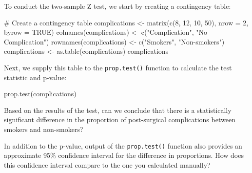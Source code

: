 \documentclass[
  letterpaper,
  DIV=11,
  numbers=noendperiod]{scrartcl}
\newenvironment{Shaded}{\begin{snugshade}}{\end{snugshade}}
\newcommand{\AttributeTok}[1]{\textcolor[rgb]{0.40,0.45,0.13}{#1}}
\newcommand{\CommentTok}[1]{\textcolor[rgb]{0.37,0.37,0.37}{#1}}
\newcommand{\ConstantTok}[1]{\textcolor[rgb]{0.56,0.35,0.01}{#1}}
\newcommand{\DecValTok}[1]{\textcolor[rgb]{0.68,0.00,0.00}{#1}}
\newcommand{\FunctionTok}[1]{\textcolor[rgb]{0.28,0.35,0.67}{#1}}
\newcommand{\NormalTok}[1]{\textcolor[rgb]{0.00,0.23,0.31}{#1}}
\newcommand{\OtherTok}[1]{\textcolor[rgb]{0.00,0.23,0.31}{#1}}
\newcommand{\StringTok}[1]{\textcolor[rgb]{0.13,0.47,0.30}{#1}}
\begin{document}
To conduct the two-sample Z test, we start by creating a contingency
table:

\begin{Shaded}
\begin{Highlighting}[]
\CommentTok{\# Create a contingency table}
\NormalTok{complications }\OtherTok{\textless{}{-}} \FunctionTok{matrix}\NormalTok{(}\FunctionTok{c}\NormalTok{(}\DecValTok{8}\NormalTok{, }\DecValTok{12}\NormalTok{, }\DecValTok{10}\NormalTok{, }\DecValTok{50}\NormalTok{), }\AttributeTok{nrow =} \DecValTok{2}\NormalTok{, }\AttributeTok{byrow =} \ConstantTok{TRUE}\NormalTok{)}
\FunctionTok{colnames}\NormalTok{(complications) }\OtherTok{\textless{}{-}} \FunctionTok{c}\NormalTok{(}\StringTok{"Complication"}\NormalTok{, }\StringTok{"No Complication"}\NormalTok{)}
\FunctionTok{rownames}\NormalTok{(complications) }\OtherTok{\textless{}{-}} \FunctionTok{c}\NormalTok{(}\StringTok{"Smokers"}\NormalTok{, }\StringTok{"Non{-}smokers"}\NormalTok{)}
\NormalTok{complications }\OtherTok{\textless{}{-}} \FunctionTok{as.table}\NormalTok{(complications)}
\NormalTok{complications}
\end{Highlighting}
\end{Shaded}

Next, we supply this table to the \texttt{prop.test()} function to
calculate the test statistic and p-value:

\begin{Shaded}
\begin{Highlighting}[]
\FunctionTok{prop.test}\NormalTok{(complications)}
\end{Highlighting}
\end{Shaded}

\begin{tcolorbox}[enhanced jigsaw, bottomrule=.15mm, coltitle=black, colbacktitle=quarto-callout-important-color!10!white, left=2mm, bottomtitle=1mm, breakable, colframe=quarto-callout-important-color-frame, toprule=.15mm, titlerule=0mm, title={Question 3}, opacitybacktitle=0.6, arc=.35mm, rightrule=.15mm, opacityback=0, leftrule=.75mm, toptitle=1mm, colback=white]

Based on the results of the test, can we conclude that there is a
statistically significant difference in the proportion of post-surgical
complications between smokers and non-smokers?

\end{tcolorbox}

\begin{tcolorbox}[enhanced jigsaw, bottomrule=.15mm, coltitle=black, colbacktitle=quarto-callout-important-color!10!white, left=2mm, bottomtitle=1mm, breakable, colframe=quarto-callout-important-color-frame, toprule=.15mm, titlerule=0mm, title={Question 4}, opacitybacktitle=0.6, arc=.35mm, rightrule=.15mm, opacityback=0, leftrule=.75mm, toptitle=1mm, colback=white]

In addition to the p-value, output of the \texttt{prop.test()} function
also provides an approximate 95\% confidence interval for the difference
in proportions. How does this confidence interval compare to the one you
calculated manually?

\end{tcolorbox}
\end{document}
